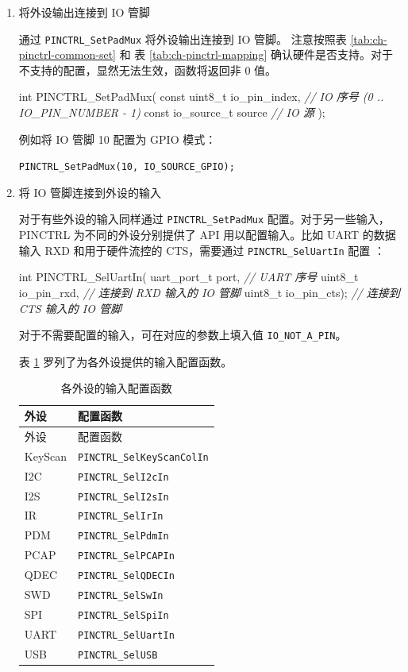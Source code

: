 \documentclass[
  12pt,
]{book}
\newenvironment{Shaded}{\begin{snugshade}}{\end{snugshade}}
\newcommand{\CommentTok}[1]{\textcolor[rgb]{0.56,0.35,0.01}{\textit{#1}}}
\newcommand{\DataTypeTok}[1]{\textcolor[rgb]{0.13,0.29,0.53}{#1}}
\newcommand{\NormalTok}[1]{#1}
\begin{document}
\begin{enumerate}
\def\labelenumi{\arabic{enumi}.}
\item
  将外设输出连接到 IO 管脚

  通过 \texttt{PINCTRL\_SetPadMux} 将外设输出连接到 IO 管脚。
  注意按照表 \ref{tab:ch-pinctrl-common-set} 和 表 \ref{tab:ch-pinctrl-mapping}
  确认硬件是否支持。对于不支持的配置，显然无法生效，函数将返回非 0 值。

\begin{Shaded}
\begin{Highlighting}[]
\DataTypeTok{int}\NormalTok{ PINCTRL_SetPadMux(}
  \DataTypeTok{const} \DataTypeTok{uint8_t}\NormalTok{ io_pin_index, }\CommentTok{// IO 序号 (0 .. IO_PIN_NUMBER - 1)}
  \DataTypeTok{const}\NormalTok{ io_source_t source    }\CommentTok{// IO 源}
\NormalTok{);}
\end{Highlighting}
\end{Shaded}

  例如将 IO 管脚 10 配置为 GPIO 模式：

  \texttt{PINCTRL\_SetPadMux(10,\ IO\_SOURCE\_GPIO);}
\item
  将 IO 管脚连接到外设的输入

  对于有些外设的输入同样通过 \texttt{PINCTRL\_SetPadMux} 配置。对于另一些输入，
  PINCTRL 为不同的外设分别提供了 API 用以配置输入。比如 UART 的数据输入 RXD 和用于硬件流控的
  CTS，需要通过 \texttt{PINCTRL\_SelUartIn} 配置 ：

\begin{Shaded}
\begin{Highlighting}[]
\DataTypeTok{int}\NormalTok{ PINCTRL_SelUartIn(}
\NormalTok{  uart_port_t port,     }\CommentTok{// UART 序号}
  \DataTypeTok{uint8_t}\NormalTok{ io_pin_rxd,   }\CommentTok{// 连接到 RXD 输入的 IO 管脚}
  \DataTypeTok{uint8_t}\NormalTok{ io_pin_cts);  }\CommentTok{// 连接到 CTS 输入的 IO 管脚}
\end{Highlighting}
\end{Shaded}

  对于不需要配置的输入，可在对应的参数上填入值 \texttt{IO\_NOT\_A\_PIN}。

  表 \ref{tab:ch-pinctrl-sel-in} 罗列了为各外设提供的输入配置函数。

  \begin{longtable}[]{@{}ll@{}}
  \caption{\label{tab:ch-pinctrl-sel-in} 各外设的输入配置函数}\tabularnewline
  \toprule
  外设 & 配置函数\tabularnewline
  \midrule
  \endfirsthead
  \toprule
  外设 & 配置函数\tabularnewline
  \midrule
  \endhead
  KeyScan & \texttt{PINCTRL\_SelKeyScanColIn}\tabularnewline
  I2C & \texttt{PINCTRL\_SelI2cIn}\tabularnewline
  I2S & \texttt{PINCTRL\_SelI2sIn}\tabularnewline
  IR & \texttt{PINCTRL\_SelIrIn}\tabularnewline
  PDM & \texttt{PINCTRL\_SelPdmIn}\tabularnewline
  PCAP & \texttt{PINCTRL\_SelPCAPIn}\tabularnewline
  QDEC & \texttt{PINCTRL\_SelQDECIn}\tabularnewline
  SWD & \texttt{PINCTRL\_SelSwIn}\tabularnewline
  SPI & \texttt{PINCTRL\_SelSpiIn}\tabularnewline
  UART & \texttt{PINCTRL\_SelUartIn}\tabularnewline
  USB & \texttt{PINCTRL\_SelUSB}\tabularnewline
  \bottomrule
  \end{longtable}
\end{enumerate}
\end{document}
